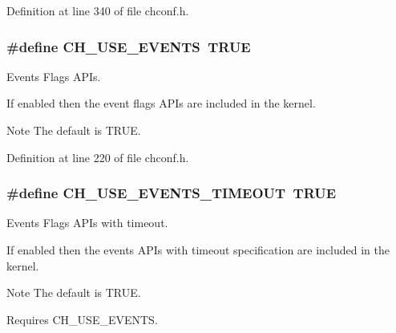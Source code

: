 Definition at line 340 of file chconf.\+h.

\hypertarget{group__config_ga5e3ac686cd33ad40a89aaaf97b3dc781}{}
\subsubsection[{C\+H\+\_\+\+U\+S\+E\+\_\+\+E\+V\+E\+N\+T\+S}]{\setlength{\rightskip}{0pt plus 5cm}\#define C\+H\+\_\+\+U\+S\+E\+\_\+\+E\+V\+E\+N\+T\+S~T\+R\+U\+E}\label{group__config_ga5e3ac686cd33ad40a89aaaf97b3dc781}


Events Flags A\+P\+Is. 

If enabled then the event flags A\+P\+Is are included in the kernel.

\begin{DoxyNote}{Note}
The default is {\ttfamily T\+R\+U\+E}. 
\end{DoxyNote}


Definition at line 220 of file chconf.\+h.

\hypertarget{group__config_ga64a6ad752750f42fe2474d3e7f191a71}{}
\subsubsection[{C\+H\+\_\+\+U\+S\+E\+\_\+\+E\+V\+E\+N\+T\+S\+\_\+\+T\+I\+M\+E\+O\+U\+T}]{\setlength{\rightskip}{0pt plus 5cm}\#define C\+H\+\_\+\+U\+S\+E\+\_\+\+E\+V\+E\+N\+T\+S\+\_\+\+T\+I\+M\+E\+O\+U\+T~T\+R\+U\+E}\label{group__config_ga64a6ad752750f42fe2474d3e7f191a71}


Events Flags A\+P\+Is with timeout. 

If enabled then the events A\+P\+Is with timeout specification are included in the kernel.

\begin{DoxyNote}{Note}
The default is {\ttfamily T\+R\+U\+E}. 

Requires {\ttfamily C\+H\+\_\+\+U\+S\+E\+\_\+\+E\+V\+E\+N\+T\+S}. 
\end{DoxyNote}


